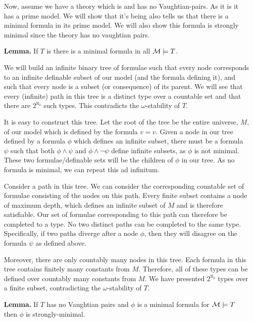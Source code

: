 Now, assume we have a theory which is \omst and has no Vaughtian-pairs. 
As it is \omst it has a prime model.
We will show that it's being \omst also tells us that there is a minimal formula in its prime model.
We will also show this formula is strongly minimal since the theory has no vaughtian pairs. 

\textbf{Lemma.} If \(T\) is \omst there is a minimal formula in all \(\mathcal{M} \models T\).

We will build an infinite binary tree of formulae such that 
every node corresponds to an infinite definable subset of our model (and the formula defining it), 
and such that every node is a subset (or consequence) of its parent. 
We will see that every (infinite) path in this tree is a distinct type over a countable set and that there are \(2^{\aleph_0}\) such types. 
This contradicts the \(\omega\)-stability of \(T\).

It is easy to construct this tree. Let the root of the tree be the entire universe, \(M\), of our model which is defined by the formula \(v = v\).
Given a node in our tree defined by a formula \(\phi\) which defines an infinite subset, there must be a formula \(\psi\) such that both \(\phi \land \psi\) and \(\phi \land \neg \psi\) define infinite subsets, as \(\phi\) is not minimal. 
These two formulae/definable sets will be the children of \(\phi\) in our tree. 
As no formula is minimal, we can repeat this ad infinitum. 

Consider a path in this tree. We can consider the corresponding countable set of formulae consisting of the nodes on this path. 
Every finite subset contains a node of maximum depth, which defines an infinite subset of \(M\) and is therefore satisfiable. 
Our set of formulae corresponding to this path can therefore be completed to a type.
No two distinct paths can be completed to the same type. 
Specifically, if two paths diverge after a node \(\phi\), then they will disagree on the formula \(\psi\) as defined above. 

Moreover, there are only countably many nodes in this tree. 
Each formula in this tree contains finitely many constants from \(M\).
Therefore, all of these types can be defined over countably many constants from \(M\). 
We have presented \(2^{\aleph_0}\) types over a finite subset, contradicting the \(\omega\)-stability of \(T\).

\textbf{Lemma.} If \(T\) has no Vaughtian pairs and \(\phi\) is a minimal formula for \(\mathcal{M} \models T\) then \(\phi\) is strongly-minimal. 

